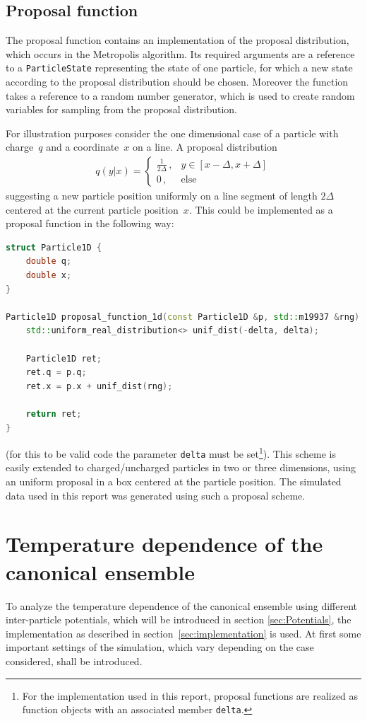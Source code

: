\documentclass[11pt, a4paper]{article}
\numberwithin{equation}{section}
\begin{document}
\subsection{Proposal function} \label{sec:proposal_function}
The proposal function contains an implementation of the proposal distribution, which occurs in the Metropolis algorithm.
Its required arguments are a reference to a \texttt{ParticleState} representing the state of one particle, for which a new state according to the proposal distribution should be chosen.
Moreover the function takes a reference to a random number generator, which is used to create random variables for sampling from the proposal distribution.

For illustration purposes consider the one dimensional case of a particle with charge~$q$ and a coordinate~$x$ on a line.
A proposal distribution
\begin{align*}
	q(y|x) = \begin{cases}
		\frac{1}{2\Delta} \,, & y \in \left[x - \Delta, x + \Delta \right]\\
		0 \,, & \text{else}
	\end{cases}
\end{align*}
suggesting a new particle position uniformly on a line segment of length $2\Delta$ centered at the current particle position~$x$.
This could be implemented as a proposal function in the following way:
\begin{lstlisting}[language=C++]
struct Particle1D {
	double q;
	double x;
}

Particle1D proposal_function_1d(const Particle1D &p, std::m19937 &rng) {
	std::uniform_real_distribution<> unif_dist(-delta, delta);
	
	Particle1D ret;
	ret.q = p.q;
	ret.x = p.x + unif_dist(rng);
	
	return ret;
}
\end{lstlisting}
(for this to be valid code the parameter \texttt{delta} must be set\footnote{For the implementation used in this report, proposal functions are realized as function objects with an associated member \texttt{delta}.}).
This scheme is easily extended to charged/uncharged particles in two or three dimensions, using an uniform proposal in a box centered at the particle position.
The simulated data used in this report was generated using such a proposal scheme.


\section{Temperature dependence of the canonical ensemble} \label{sec:Temperature}
To analyze the temperature dependence of the canonical ensemble using different inter-particle potentials, which will be introduced in section \ref{sec:Potentials}, the implementation as described in section~\ref{sec:implementation} is used.
At first some important settings of the simulation, which vary depending on the case considered, shall be introduced.
\end{document}
